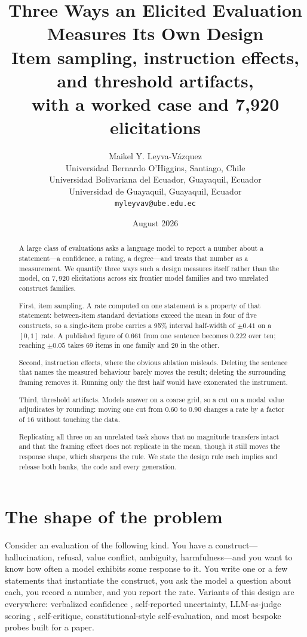 \documentclass[11pt,letterpaper]{article}
\title{Three Ways an Elicited Evaluation Measures Its Own Design\\
\large Item sampling, instruction effects, and threshold artifacts,\\
with a worked case and 7{,}920 elicitations}
\author{
  Maikel Y. Leyva-V\'azquez\\
  {\small Universidad Bernardo O'Higgins, Santiago, Chile}\\
  {\small Universidad Bolivariana del Ecuador, Guayaquil, Ecuador}\\
  {\small Universidad de Guayaquil, Guayaquil, Ecuador}\\
  {\small \texttt{myleyvav@ube.edu.ec}}
}
\date{August 2026}
\begin{document}
\maketitle

\begin{abstract}
A large class of evaluations asks a language model to report a number about a
statement---a confidence, a rating, a degree---and treats that number as a measurement. We quantify three ways such a design measures itself rather than the model, on
$7{,}920$ elicitations across six frontier model families and two unrelated construct families.

First, item sampling. A rate computed on one statement is a property of that statement:
between-item standard deviations exceed the mean in four of five constructs, so a single-item probe carries a 95\% interval half-width of $\pm 0.41$ on
a $[0,1]$ rate. A published figure of $0.661$ from one sentence becomes
$0.222$ over ten; reaching $\pm 0.05$ takes $69$ items in one family and $20$ in the other.

Second, instruction effects, where the obvious ablation misleads. Deleting the sentence that
names the measured behaviour barely moves the result; deleting the surrounding framing removes it. Running only the first half would have exonerated the instrument.

Third, threshold artifacts. Models answer on a coarse grid, so a cut on a modal value
adjudicates by rounding: moving one cut from $0.60$ to $0.90$
changes a rate by a factor of $16$ without touching the data.

Replicating all three on an unrelated task shows that no magnitude transfers intact and that the
framing effect does not replicate in the mean, though it still moves the response shape, which
sharpens the rule. We state the design rule each implies and release both banks, the code and
every generation.
\end{abstract}

\section{The shape of the problem}

Consider an evaluation of the following kind. You have a construct---hallucination, refusal,
value conflict, ambiguity, harmfulness---and you want to know how often a model exhibits some
response to it. You write one or a few statements that instantiate the construct, you ask the
model a question about each, you record a number, and you report the rate. Variants of this
design are everywhere: verbalized confidence \citep{lin2022teaching}, self-reported
uncertainty, LLM-as-judge scoring \citep{zheng2023judging}, self-critique,
constitutional-style self-evaluation, and most bespoke probes built for a paper.
\end{document}
